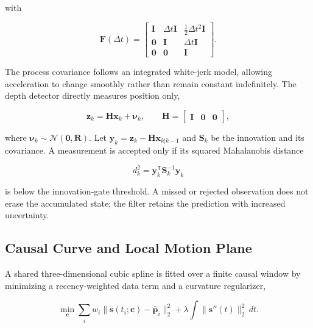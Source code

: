 \documentclass[conference]{IEEEtran}
\begin{document}
with

\begin{equation}
\mathbf{F}(\Delta t)=
\begin{bmatrix}
\mathbf{I}&\Delta t\mathbf{I}&\frac{1}{2}\Delta t^2\mathbf{I}\\
\mathbf{0}&\mathbf{I}&\Delta t\mathbf{I}\\
\mathbf{0}&\mathbf{0}&\mathbf{I}
\end{bmatrix}.

\end{equation}

The process covariance follows an integrated white-jerk model, allowing acceleration to change smoothly rather than remain constant indefinitely. The depth detector directly measures position only,

\begin{equation}
\mathbf{z}_k=\mathbf{H}\mathbf{x}_k+\boldsymbol{\nu}_k,\qquad
\mathbf{H}=\begin{bmatrix}\mathbf{I}&\mathbf{0}&\mathbf{0}\end{bmatrix},

\end{equation}

where \(\boldsymbol{\nu}_k\sim\mathcal{N}(\mathbf{0},\mathbf{R})\). Let \(\mathbf{y}_k=\mathbf{z}_k-\mathbf{H}\mathbf{x}_{k|k-1}\) and \(\mathbf{S}_k\) be the innovation and its covariance. A measurement is accepted only if its squared Mahalanobis distance

\begin{equation}
d_k^2=\mathbf{y}_k^{\mathsf T}\mathbf{S}_k^{-1}\mathbf{y}_k

\end{equation}

is below the innovation-gate threshold. A missed or rejected observation does not erase the accumulated state; the filter retains the prediction with increased uncertainty.

\subsection{Causal Curve and Local Motion Plane}

A shared three-dimensional cubic spline is fitted over a finite causal window by minimizing a recency-weighted data term and a curvature regularizer,

\begin{equation}
\min_{\mathbf{c}}
\sum_i w_i\|\mathbf{s}(t_i;\mathbf{c})-\hat{\mathbf{p}}_i\|_2^2
+\lambda\int\|\mathbf{s}''(t)\|_2^2\,dt.

\end{equation}
\end{document}
